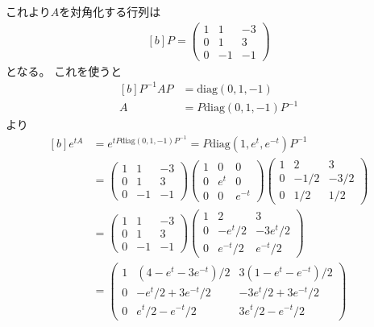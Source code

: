 \documentclass[../ap_2014.tex]{subfiles}
\begin{document}
これより\(A\)を対角化する行列は
\begin{equation}\begin{aligned}[b]
    P = \begin{pmatrix}
        1 & 1 & -3\\
        0 & 1 & 3\\
        0 & -1 & -1
    \end{pmatrix}
\end{aligned}\end{equation}
となる。
これを使うと
\begin{equation}\begin{aligned}[b]
    P^{-1}AP &= \text{diag}(0,1,-1)\\
    A &= P\text{diag}(0,1,-1)P^{-1}
\end{aligned}\end{equation}
より
\begin{equation}\begin{aligned}[b]
    e^{tA} &= e^{tP\text{diag}(0,1,-1)P^{-1}}=P\text{diag}(1,e^{t},e^{-t})P^{-1}\\
    &=\begin{pmatrix}
        1 & 1 & -3\\
        0 & 1 & 3\\
        0 & -1 & -1
    \end{pmatrix}
    \begin{pmatrix}
        1 & 0 & 0\\
        0 & e^{t} & 0\\
        0 & 0 & e^{-t}
    \end{pmatrix}
    \begin{pmatrix}
        1 & 2 & 3 \\
        0 & -1/2 & -3/2\\
        0 &1/2 & 1/2
    \end{pmatrix}\\
    &=\begin{pmatrix}
        1 & 1 & -3\\
        0 & 1 & 3\\
        0 & -1 & -1
    \end{pmatrix}
    \begin{pmatrix}
        1 & 2 & 3\\
        0 & -e^{t}/2 & -3e^{t}/2\\
        0 & e^{-t}/2 &e^{-t}/2
    \end{pmatrix}\\
    &= \begin{pmatrix}
        1 & (4-e^{t}-3e^{-t})/2 & 3(1-e^{t}-e^{-t})/2\\
        0 & -e^{t}/2+3e^{-t}/2 & -3e^{t}/2+3e^{-t}/2\\
        0 & e^{t}/2-e^{-t}/2 & 3e^{t}/2-e^{-t}/2
    \end{pmatrix}
\end{aligned}\end{equation}
\end{document}
